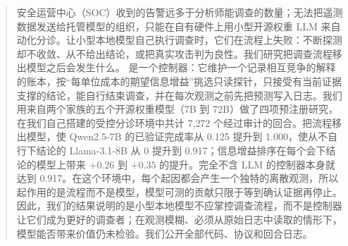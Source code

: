 \begin{abstract}
安全运营中心（SOC）收到的告警远多于分析师能调查的数量；无法把遥测数据发送给托管模型的组织，只能在自有硬件上用小型开源权重 LLM 来自动化分诊。让小型本地模型自己执行调查时，它们在流程上失败：不断探测却不收敛、从不给出结论，或把真实攻击判为良性。我们研究把调查流程移出模型之后会发生什么。\hesp{} 是一个控制器：它维护一个记录相互竞争的解释的账本，按“每单位成本的期望信息增益”挑选只读探针，只接受有当前证据支撑的结论，能自行结束调查，并在每次观测之前先把预测写入日志。我们用来自两个家族的五个开源权重模型（7B 到 72B）做了四项预注册研究，在我们自己搭建的受控分诊环境中共计 7{,}272 个经过审计的回合。把流程移出模型，使 Qwen2.5-7B 的已验证完成率从 0.125 提升到 1.000，使从不自行下结论的 Llama-3.1-8B 从 0 提升到 0.917；信息增益排序在每个会下结论的模型上带来 $+0.26$ 到 $+0.35$ 的提升。完全不含 LLM 的控制器本身就达到 0.917。在这个环境中，每个起因都会产生一个独特的离散观测，所以起作用的是流程而不是模型，模型可测的贡献只限于等到确认证据再停止。因此，我们的结果说明的是小型本地模型不应掌控调查流程，而不是控制器让它们成为更好的调查者；在观测模糊、必须从原始日志中读取的情形下，模型能否带来价值仍未检验。我们公开全部代码、协议和回合日志。
\end{abstract}
